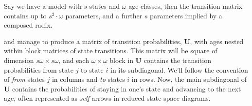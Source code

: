 \documentclass{article}
\begin{document}
Say we have a model with $s$ states and $\omega$ age classes, then the transition matrix contains up to $s^2\cdot\omega$ parameters, and a further $s$ parameters implied by a composed radix.


and manage to produce a matrix of transition probabilities, $\textbf{U}$, with ages nested within block matrices of state transitions. This matrix will be square of dimension $s\omega \times s\omega$, and each $\omega \times \omega$ block in $\textbf{U}$ contains the transition probabilities from state $j$ to state $i$ in its subdiagonal. We'll follow the convention of \emph{from} states $j$ in columns and \emph{to} states $i$ in rows. Now,
the main subdiagonal of $\textbf{U}$ contains the probabilities of staying in one's state and advancing to the next age, often represented as \emph{self} arrows in reduced state-space diagrams. 
\end{document}
